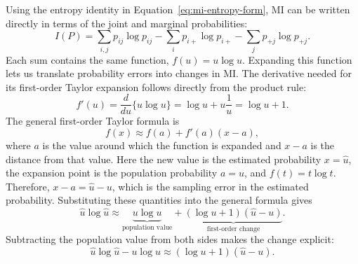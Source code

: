 Using the entropy identity in Equation~\eqref{eq:mi-entropy-form}, MI can be
written directly in terms of the joint and marginal probabilities:
\begin{equation}
  I(P)
  =
  \sum_{i,j}p_{ij}\log p_{ij}
  -\sum_i p_{i+}\log p_{i+}
  -\sum_j p_{+j}\log p_{+j}.
  \label{eq:mi-probability-sums}
\end{equation}
Each sum contains the same function, \(f(u)=u\log u\). Expanding this
function lets us translate probability errors into changes in MI. The
derivative needed for its first-order Taylor
expansion follows directly from the product rule:
\begin{equation}
  f'(u)
  =\frac{d}{du}\{u\log u\}
  =\log u+u\frac{1}{u}
  =\log u+1.
  \label{eq:ulog-derivative-background}
\end{equation}
The general first-order Taylor formula is
\begin{equation}
  f(x)\approx f(a)+f'(a)(x-a),
  \label{eq:general-first-order-taylor-background}
\end{equation}
where \(a\) is the value around which the function is expanded and \(x-a\)
is the distance from that value. Here the new value is the estimated
probability \(x=\widehat u\), the expansion point is the population probability
\(a=u\), and \(f(t)=t\log t\). Therefore, \(x-a=\widehat u-u\), which is the
sampling error in the estimated probability. Substituting these quantities
into the general formula gives
\begin{equation}
  \widehat u\log\widehat u
  \approx
  \underbrace{u\log u}_{\text{population value}}
  +
  \underbrace{(\log u+1)(\widehat u-u)}_{\text{first-order change}}.
  \label{eq:first-order-taylor-background}
\end{equation}
Subtracting the population value from both sides makes the change explicit:
\begin{equation}
  \widehat u\log\widehat u-u\log u
  \approx
  (\log u+1)(\widehat u-u).
  \label{eq:ulog-change-background}
\end{equation}

